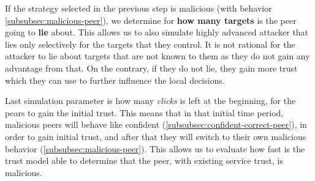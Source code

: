 If the strategy selected in the previous step is malicious (with behavior \ref{subsubsec:malicious-peer}), we determine for \textbf{how many targets} is the peer going to \textbf{lie} about.
This allows us to also simulate highly advanced attacker that lies only selectively for the targets that they control.
It is not rational for the attacker to lie about targets that are not known to them as they do not gain any advantage from that. On the contrary, if they do not lie, they gain more trust which they can use to further influence the local decisions. 

Last simulation parameter is how many \textit{clicks} is left at the beginning, for the pears to gain the initial trust.
This means that in that initial time period, malicious peers will behave like confident (\ref{subsubsec:confident-correct-peer}), in order to gain initial trust, and after that they will switch to their own malicious behavior (\ref{subsubsec:malicious-peer}).
This allows us to evaluate how fast is the trust model able to determine that the peer, with existing service trust, is malicious.